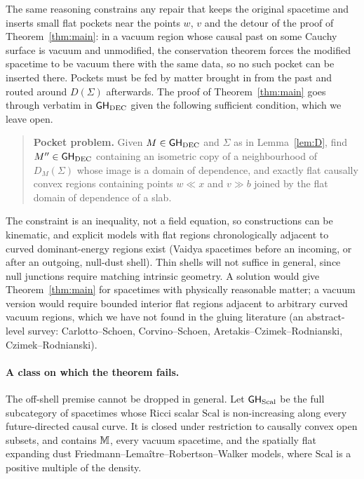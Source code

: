 The same reasoning constrains any repair that keeps the original spacetime and
inserts small flat pockets near the points $w$, $v$ and the detour of the proof of Theorem~\ref{thm:main}: in a vacuum region
whose causal past on some Cauchy surface is vacuum and unmodified, the
conservation theorem forces the modified spacetime to be vacuum there with the
same data, so no such pocket can be inserted there. Pockets must be fed by matter brought
in from the past and routed around $D(\Sigma)$ afterwards. The proof of
Theorem~\ref{thm:main} goes through verbatim in $\mathsf{GH}_{\mathrm{DEC}}$ given
the following sufficient condition, which we leave open.

\begin{quote}
\textbf{Pocket problem.} Given $M\in\mathsf{GH}_{\mathrm{DEC}}$ and $\Sigma$ as in Lemma~\ref{lem:D},
find $M''\in\mathsf{GH}_{\mathrm{DEC}}$ containing an isometric copy of a neighbourhood
of $D_M(\Sigma)$ whose image is a domain of dependence, and exactly flat
causally convex regions containing points $w\ll x$ and $v\gg b$ joined by the
flat domain of dependence of a slab.
\end{quote}

The constraint is an inequality, not a field equation, so constructions can be
kinematic, and explicit models with flat regions chronologically adjacent to
curved dominant-energy regions exist (Vaidya spacetimes before an incoming, or
after an outgoing, null-dust shell). Thin shells will not suffice in general,
since null junctions require matching intrinsic geometry. A solution would
give Theorem~\ref{thm:main} for spacetimes with physically reasonable matter;
a vacuum version would require bounded interior flat regions adjacent to
arbitrary curved vacuum regions, which we have not found in the gluing
literature (an abstract-level survey: Carlotto--Schoen, Corvino--Schoen,
Aretakis--Czimek--Rodnianski, Czimek--Rodnianski).

\paragraph{A class on which the theorem fails.} The off-shell premise cannot be
dropped in general. Let $\mathsf{GH}_{\mathrm{Scal}}$ be the full subcategory of spacetimes whose
Ricci scalar $\mathrm{Scal}$ is non-increasing along every future-directed causal curve.
It is closed under restriction to causally convex open subsets, and contains
$\mathbb M$, every vacuum spacetime, and the spatially flat expanding dust
Friedmann--Lemaître--Robertson--Walker models, where $\mathrm{Scal}$ is a positive
multiple of the density.

